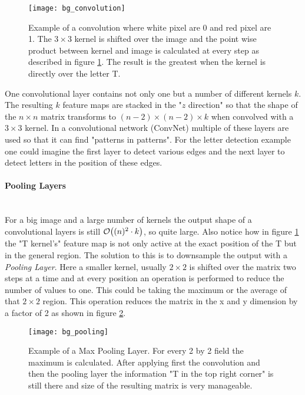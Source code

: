 

\begin{figure}[H]
    \centering
    \texttt{[image: bg\_convolution]}
    \caption{Example of a convolution where white pixel are 0 and red pixel are 1. The $3 \times 3$ kernel is shifted over the image and the point wise product between kernel and image is calculated at every step as described in figure \ref{fig:bg:convolution}. The result is the greatest when the kernel is directly over the letter T.}
    \label{fig:bg:convolution}
\end{figure}

One convolutional layer contains not only one but a number of different kernels $k$. The resulting $k$ feature maps are stacked in the "$z$ direction" so that the shape of the $n \times n$ matrix transforms to $(n-2) \times (n-2) \times k$ when convolved with a $3 \times 3$ kernel. In a convolutional network (ConvNet) multiple of these layers are used so that it can find "patterns in patterns". For the letter detection example one could imagine the first layer to detect various edges and the next layer to detect letters in the position of these edges.

\paragraph{Pooling Layers}~\\
For a big image and a large number of kernels the output shape of a convolutional layers is still $\order{(n)^2 \cdot k}$, so quite large. Also notice how in figure \ref{fig:bg:convolution} the "T kernel's" feature map is not only active at the exact position of the T but in the general region. The solution to this is to downsample the output with a \textit{Pooling Layer}. Here a smaller kernel, usually $2 \times 2$ is shifted over the matrix two steps at a time and at every position an operation is performed to reduce the number of values to one. This could be taking the maximum or the average of that $2 \times 2$ region. This operation reduces the matrix in the x and y dimension by a factor of 2 as shown in figure \ref{fig:bg:pooling}.

\begin{figure}[H]
    \centering
    \texttt{[image: bg\_pooling]}
    \caption{Example of a Max Pooling Layer. For every 2 by 2 field the maximum is calculated. After applying first the convolution and then the pooling layer the information "T in the top right corner" is still there and size of the resulting matrix is very manageable.}
    \label{fig:bg:pooling}
\end{figure}
\vspace{1cm}

